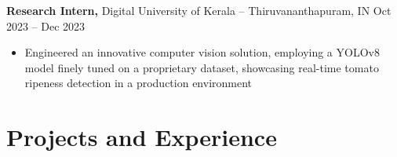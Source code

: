 \documentclass[11pt]{article}       %
\begin{document}
\textbf{Research Intern,} Digital University of Kerala -- Thiruvananthapuram, IN \hfill Oct 2023 -- Dec 2023 \\
\vspace{-9pt}
\begin{itemize}
  \item Engineered an innovative computer vision solution, employing a YOLOv8 model finely tuned on a proprietary dataset, showcasing real-time tomato ripeness detection in a production environment
\end{itemize}



\vspace{-18.5pt}

\section*{Projects and Experience}
\end{document}
